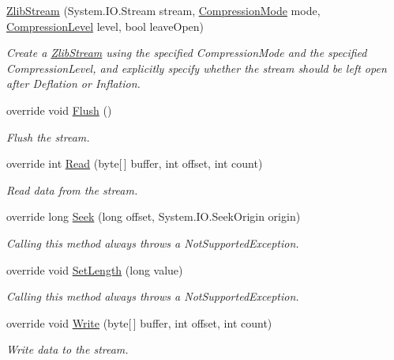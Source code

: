 \begin{DoxyCompactItemize}
\mbox{\hyperlink{class_super_tiled2_unity_1_1_ionic_1_1_zlib_1_1_zlib_stream_ad4b48e3f1d325ef94d890723be825d85}{Zlib\+Stream}} (System.\+I\+O.\+Stream stream, \mbox{\hyperlink{namespace_super_tiled2_unity_1_1_ionic_1_1_zlib_ad5b7635d92497e1c905e5de82eb1c6b1}{Compression\+Mode}} mode, \mbox{\hyperlink{namespace_super_tiled2_unity_1_1_ionic_1_1_zlib_a20f6771804996c363f454ad9765cd7db}{Compression\+Level}} level, bool leave\+Open)
\begin{DoxyCompactList}\small\item\em Create a {\ttfamily \mbox{\hyperlink{class_super_tiled2_unity_1_1_ionic_1_1_zlib_1_1_zlib_stream}{Zlib\+Stream}}} using the specified {\ttfamily Compression\+Mode} and the specified {\ttfamily Compression\+Level}, and explicitly specify whether the stream should be left open after Deflation or Inflation. \end{DoxyCompactList}\item 
override void \mbox{\hyperlink{class_super_tiled2_unity_1_1_ionic_1_1_zlib_1_1_zlib_stream_af13e6fb7438e8b9a1a77ec89aabedeef}{Flush}} ()
\begin{DoxyCompactList}\small\item\em Flush the stream. \end{DoxyCompactList}\item 
override int \mbox{\hyperlink{class_super_tiled2_unity_1_1_ionic_1_1_zlib_1_1_zlib_stream_a0987720c2d2c6219e1f1cbd9ae8ee818}{Read}} (byte\mbox{[}$\,$\mbox{]} buffer, int offset, int count)
\begin{DoxyCompactList}\small\item\em Read data from the stream. \end{DoxyCompactList}\item 
override long \mbox{\hyperlink{class_super_tiled2_unity_1_1_ionic_1_1_zlib_1_1_zlib_stream_aa82b389bedbd663d92b2c5aa4500b917}{Seek}} (long offset, System.\+I\+O.\+Seek\+Origin origin)
\begin{DoxyCompactList}\small\item\em Calling this method always throws a Not\+Supported\+Exception. \end{DoxyCompactList}\item 
override void \mbox{\hyperlink{class_super_tiled2_unity_1_1_ionic_1_1_zlib_1_1_zlib_stream_a13d9e75b41788d1592c2278b349b6645}{Set\+Length}} (long value)
\begin{DoxyCompactList}\small\item\em Calling this method always throws a Not\+Supported\+Exception. \end{DoxyCompactList}\item 
override void \mbox{\hyperlink{class_super_tiled2_unity_1_1_ionic_1_1_zlib_1_1_zlib_stream_a042abef8f9aa0d0043e6081d9de7dea7}{Write}} (byte\mbox{[}$\,$\mbox{]} buffer, int offset, int count)
\begin{DoxyCompactList}\small\item\em Write data to the stream. \end{DoxyCompactList}\end{DoxyCompactItemize}
